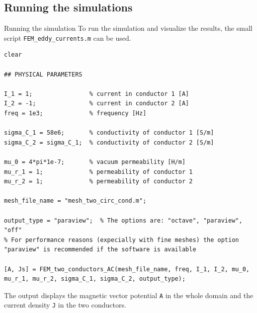 \documentclass[aspectratio=54,xcolor=dvipsnames]{beamer}
\begin{document}
\subsection{Running the simulations}
\begin{frame}[fragile]{Running the simulation}
\small
To run the simulation and visualize the results, the small script \texttt{FEM\_eddy\_currents.m} can be used. 
\begin{lstlisting}[firstnumber=1]
clear

## PHYSICAL PARAMETERS

I_1 = 1;                % current in conductor 1 [A]
I_2 = -1;               % current in conductor 2 [A]
freq = 1e3;             % frequency [Hz]

sigma_C_1 = 58e6;       % conductivity of conductor 1 [S/m]
sigma_C_2 = sigma_C_1;  % conductivity of conductor 2 [S/m]

mu_0 = 4*pi*1e-7;       % vacuum permeability [H/m]
mu_r_1 = 1;             % permeability of conductor 1
mu_r_2 = 1;             % permeability of conductor 2

mesh_file_name = "mesh_two_circ_cond.m";

output_type = "paraview";  % The options are: "octave", "paraview", "off"
% For performance reasons (expecially with fine meshes) the option "paraview" is recommended if the software is available

[A, Js] = FEM_two_conductors_AC(mesh_file_name, freq, I_1, I_2, mu_0, mu_r_1, mu_r_2, sigma_C_1, sigma_C_2, output_type);
\end{lstlisting}
The output displays the magnetic vector potential \texttt{A} in the whole domain and the current density \texttt{J} in the two conductors.
\end{frame}
\end{document}
